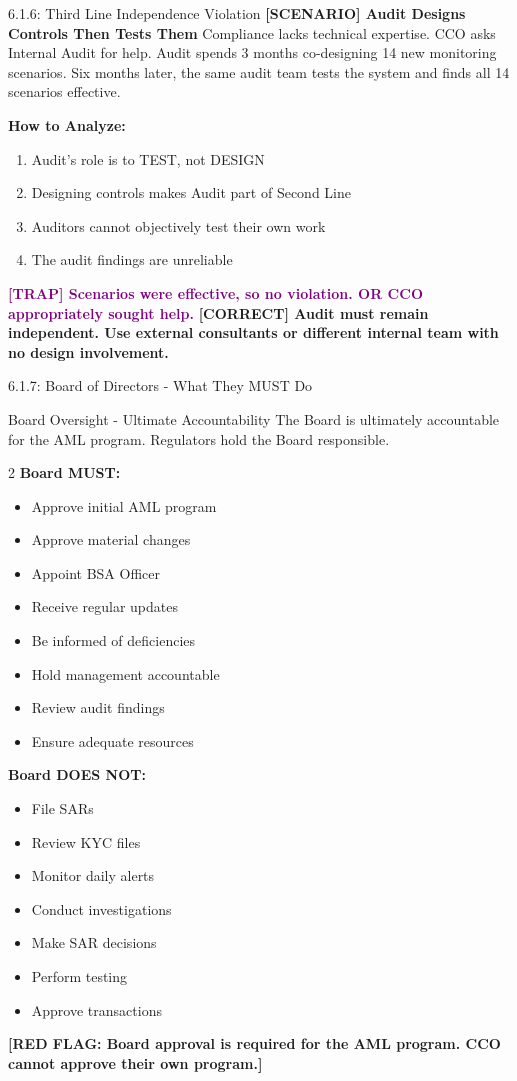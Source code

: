 \documentclass[11pt,a4paper]{beamer}
\newcommand{\trap}[1]{\textcolor{purple}{\textbf{[TRAP] #1}}}
\newcommand{\correct}[1]{\textcolor{green!50!black}{\textbf{[CORRECT] #1}}}
\newcommand{\scenario}[1]{\textcolor{blue!70!black}{\textbf{[SCENARIO] #1}}}
\newcommand{\redflag}[1]{\textcolor{red!80!black}{\textbf{[RED FLAG: #1]}}}
\begin{document}
\begin{frame}{6.1.6: Third Line Independence Violation}
	\scenario{Audit Designs Controls Then Tests Them}
	Compliance lacks technical expertise. CCO asks Internal Audit for help. Audit spends 3 months co-designing 14 new monitoring scenarios. Six months later, the same audit team tests the system and finds all 14 scenarios effective.
	
	\vspace{0.1cm}
	\textbf{How to Analyze:}
	\begin{enumerate}
		\item Audit's role is to TEST, not DESIGN
		\item Designing controls makes Audit part of Second Line
		\item Auditors cannot objectively test their own work
		\item The audit findings are unreliable
	\end{enumerate}
	\trap{Scenarios were effective, so no violation. OR CCO appropriately sought help.}
	\correct{Audit must remain independent. Use external consultants or different internal team with no design involvement.}
\end{frame}

\begin{frame}{6.1.7: Board of Directors - What They MUST Do}
	\begin{block}{Board Oversight - Ultimate Accountability}
		The Board is ultimately accountable for the AML program. Regulators hold the Board responsible.
	\end{block}
	\begin{multicols}{2}
		\textbf{Board MUST:}
		\begin{itemize}
			\item Approve initial AML program
			\item Approve material changes
			\item Appoint BSA Officer
			\item Receive regular updates
			\item Be informed of deficiencies
			\item Hold management accountable
			\item Review audit findings
			\item Ensure adequate resources
		\end{itemize}
		\columnbreak
		\textbf{Board DOES NOT:}
		\begin{itemize}
			\item File SARs
			\item Review KYC files
			\item Monitor daily alerts
			\item Conduct investigations
			\item Make SAR decisions
			\item Perform testing
			\item Approve transactions
		\end{itemize}
	\end{multicols}
	\redflag{Board approval is required for the AML program. CCO cannot approve their own program.}
\end{frame}
\end{document}
